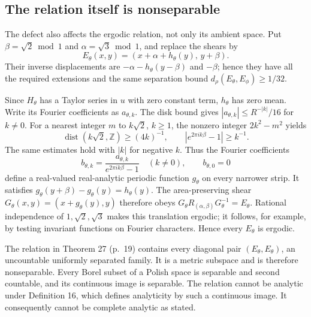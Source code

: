 \documentclass[10pt]{article}
\begin{document}
\subsection*{The relation itself is nonseparable}
The defect also affects the ergodic relation, not only its ambient space. Put \(\beta=\sqrt2\bmod1\) and \(\alpha=\sqrt3\bmod1\), and replace the shears by \[E_\theta(x,y)=(x+\alpha+h_\theta(y),\,y+\beta).\] Their inverse displacements are \(-\alpha-h_\theta(y-\beta)\) and \(-\beta\); hence they have all the required extensions and the same separation bound \(d_\rho(E_\theta,E_\phi)\ge1/32\).\par
Since \(H_\theta\) has a Taylor series in \(u\) with zero constant term, \(h_\theta\) has zero mean. Write its Fourier coefficients as \(a_{\theta,k}\). The disk bound gives \(|a_{\theta,k}|\le R^{-|k|}/16\) for \(k\ne0\). For a nearest integer \(m\) to \(k\sqrt2\), \(k\ge1\), the nonzero integer \(2k^2-m^2\) yields \[\operatorname{dist}(k\sqrt2,\mathbb Z)\ge(4k)^{-1},
 \qquad |e^{2\pi ik\beta}-1|\ge k^{-1}.\] The same estimates hold with \(|k|\) for negative \(k\). Thus the Fourier coefficients \[b_{\theta,k}=\frac{a_{\theta,k}}{e^{2\pi ik\beta}-1}\quad(k\ne0),
 \qquad b_{\theta,0}=0\] define a real-valued real-analytic periodic function \(g_\theta\) on every narrower strip. It satisfies \(g_\theta(y+\beta)-g_\theta(y)=h_\theta(y)\). The area-preserving shear \(G_\theta(x,y)=(x+g_\theta(y),y)\) therefore obeys \(G_\theta R_{(\alpha,\beta)}G_\theta^{-1}=E_\theta\). Rational independence of \(1,\sqrt2,\sqrt3\) makes this translation ergodic; it follows, for example, by testing invariant functions on Fourier characters. Hence every \(E_\theta\) is ergodic.\par
The relation in Theorem 27 (p. 19) contains every diagonal pair \((E_\theta,E_\theta)\), an uncountable uniformly separated family. It is a metric subspace and is therefore nonseparable. Every Borel subset of a Polish space is separable and second countable, and its continuous image is separable. The relation cannot be analytic under Definition 16, which defines analyticity by such a continuous image. It consequently cannot be complete analytic as stated.\par
\end{document}
